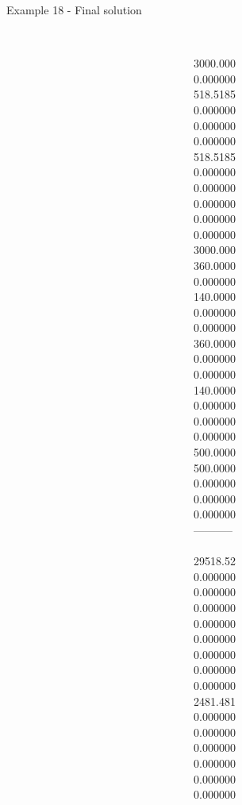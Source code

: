 \begin{frame}{Example 18 - Final solution}
\begin{columns}[t]
\begin{column}{0.3\textwidth}
\end{column}
\begin{column}{0.3\textwidth}
\\
3000.000\\
0.000000\\
518.5185\\
0.000000\\
0.000000\\
0.000000\\
518.5185\\
0.000000\\
0.000000\\
0.000000\\
0.000000\\
0.000000\\
3000.000\\
360.0000\\
0.000000\\
140.0000\\
0.000000\\
0.000000\\
360.0000\\
0.000000\\
0.000000\\
140.0000\\
0.000000\\
0.000000\\
0.000000\\
500.0000\\
500.0000\\
0.000000\\
0.000000\\
0.000000\\
-----------\\
\\
29518.52\\
0.000000\\
0.000000\\
0.000000\\
0.000000\\
0.000000\\
0.000000\\
0.000000\\
0.000000\\
2481.481\\
0.000000\\
0.000000\\
0.000000\\
0.000000\\
0.000000\\
0.000000\\

\end{column}
\end{columns}
\end{frame}
